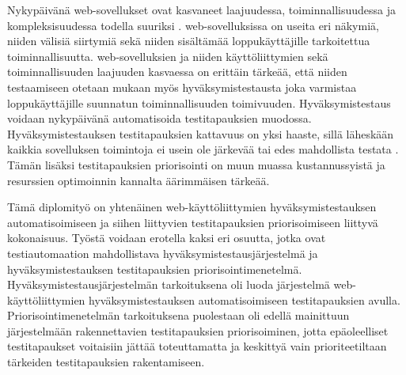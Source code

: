 Nykypäivänä web-sovellukset ovat kasvaneet laajuudessa, toiminnallisuudessa ja kompleksisuudessa todella suuriksi \parencite{web_app_complexity}.
web-sovelluksissa on useita eri näkymiä, niiden välisiä siirtymiä sekä niiden sisältämää loppukäyttäjille tarkoitettua toiminnallisuutta.
web-sovelluksien ja niiden käyttöliittymien sekä toiminnallisuuden laajuuden kasvaessa on erittäin tärkeää, että niiden testaamiseen otetaan mukaan myös hyväksymistestausta joka varmistaa loppukäyttäjille suunnatun toiminnallisuuden toimivuuden.
Hyväksymistestaus voidaan nykypäivänä automatisoida testitapauksien muodossa.
Hyväksymistestauksen testitapauksien kattavuus on yksi haaste, sillä läheskään kaikkia sovelluksen toimintoja ei usein ole järkevää tai edes mahdollista testata \parencite{testing_possibility}.
Tämän lisäksi testitapauksien priorisointi on muun muassa kustannussyistä ja resurssien optimoinnin kannalta äärimmäisen tärkeää.

Tämä diplomityö on yhtenäinen web-käyttöliittymien hyväksymistestauksen automatisoimiseen ja siihen liittyvien testitapauksien priorisoimiseen liittyvä kokonaisuus.
Työstä voidaan erotella kaksi eri osuutta, jotka ovat testiautomaation mahdollistava hyväksymistestausjärjestelmä ja hyväksymistestauksen testitapauksien priorisointimenetelmä.
Hyväksymistestausjärjestelmän tarkoituksena oli luoda järjestelmä web-käyttöliittymien hyväksymistestauksen automatisoimiseen testitapauksien avulla.
Priorisointimenetelmän tarkoituksena puolestaan oli edellä mainittuun järjestelmään rakennettavien testitapauksien priorisoiminen, jotta epäoleelliset testitapaukset voitaisiin jättää toteuttamatta ja keskittyä vain prioriteetiltaan tärkeiden testitapauksien rakentamiseen.

